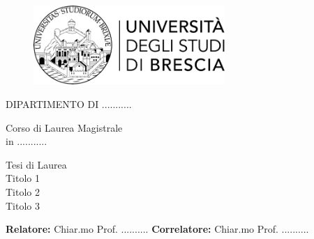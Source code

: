 \begin{titlepage}
    \begin{center}
        
        \begin{figure}[t]
            \centering
            \includegraphics[width=72.4mm,height=30mm]{logo_unibs.png}    
        \end{figure}

        \vspace*{10mm}
        
        {\fontsize{17}{17}\selectfont
            DIPARTIMENTO DI ...........\\
        }

        \vspace*{10mm}

        {\fontsize{17}{17}\selectfont
            Corso di Laurea Magistrale\\
            in ...........\\

        }    
        
        \vspace*{20mm}

        {\fontsize{20}{20}\selectfont 
            Tesi di Laurea\\
            Titolo 1\\
            Titolo 2\\
            Titolo 3\\
        }

    \end{center}

    \vfill

    \begin{flushleft}
        {\fontsize{17}{17}\selectfont 
            \textbf{Relatore:} Chiar.mo Prof. ..........
            \textbf{Correlatore:} Chiar.mo Prof. ..........
        }
        

\end{flushleft}
\end{titlepage}
